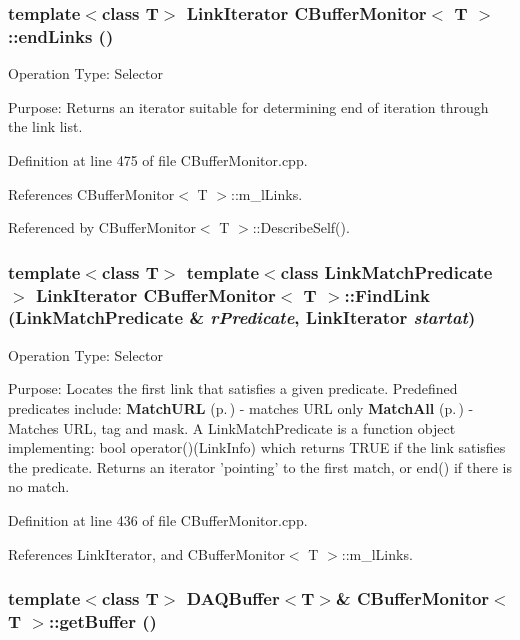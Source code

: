 \subsubsection{\setlength{\rightskip}{0pt plus 5cm}template$<$class T$>$ {\bf Link\-Iterator} CBuffer\-Monitor$<$ T $>$::end\-Links ()}\label{classCBufferMonitor_a13}


Operation Type: Selector

Purpose: Returns an iterator suitable for determining end of iteration through the link list. 

Definition at line 475 of file CBuffer\-Monitor.cpp.

References CBuffer\-Monitor$<$ T $>$::m\_\-l\-Links.

Referenced by CBuffer\-Monitor$<$ T $>$::Describe\-Self().
\subsubsection{\setlength{\rightskip}{0pt plus 5cm}template$<$class T$>$ template$<$class Link\-Match\-Predicate$>$ {\bf Link\-Iterator} CBuffer\-Monitor$<$ T $>$::Find\-Link (Link\-Match\-Predicate \& {\em r\-Predicate}, {\bf Link\-Iterator} {\em startat})}\label{classCBufferMonitor_a11}


Operation Type: Selector

Purpose: Locates the first link that satisfies a given predicate. Predefined predicates include: {\bf Match\-URL} {\rm (p.\,\pageref{classMatchURL})} - matches URL only {\bf Match\-All} {\rm (p.\,\pageref{classMatchAll})} - Matches URL, tag and mask. A Link\-Match\-Predicate is a function object implementing: bool operator()(Link\-Info) which returns TRUE if the link satisfies the predicate. Returns an iterator 'pointing' to the first match, or end() if there is no match. 

Definition at line 436 of file CBuffer\-Monitor.cpp.

References Link\-Iterator, and CBuffer\-Monitor$<$ T $>$::m\_\-l\-Links.
\subsubsection{\setlength{\rightskip}{0pt plus 5cm}template$<$class T$>$ DAQBuffer$<$T$>$\& CBuffer\-Monitor$<$ T $>$::get\-Buffer ()\hspace{0.3cm}{\tt  [inline]}}\label{classCBufferMonitor_a4}




